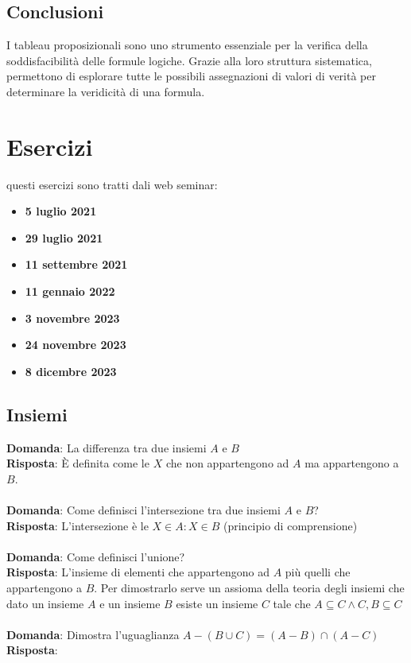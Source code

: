 \documentclass{article}
\begin{document}
\subsection{Conclusioni}

I tableau proposizionali sono uno strumento essenziale per la verifica della soddisfacibilità delle formule logiche. Grazie alla loro struttura sistematica, permettono di esplorare tutte le possibili assegnazioni di valori di verità per determinare la veridicità di una formula.

\newpage
\section{Esercizi}
questi esercizi sono tratti dali web seminar:
\begin{itemize}
    \item \textbf{5 luglio 2021}
    \item \textbf{29 luglio 2021}
    \item \textbf{11 settembre 2021}
    \item \textbf{11 gennaio 2022}
    \item \textbf{3 novembre 2023}
    \item \textbf{24 novembre 2023}
    \item \textbf{8 dicembre 2023}
\end{itemize}

\subsection{Insiemi}
\textbf{Domanda}: La differenza tra due insiemi $A$ e $B$  \\
\textbf{Risposta}: È definita come le $X$ che non appartengono ad $A$ ma appartengono a $B$. \\ \\
\textbf{Domanda}: Come definisci l'intersezione tra due insiemi $A$ e $B$? \\
\textbf{Risposta}: L'intersezione è le $X \in A: X \in B$ (principio di comprensione) \\ \\
\textbf{Domanda}: Come definisci l'unione? \\
\textbf{Risposta}: L'insieme di elementi che appartengono ad $A$ più quelli che appartengono a $B$. Per dimostrarlo serve un assioma della teoria degli insiemi che dato un insieme $A$ e un insieme $B$ esiste un insieme $C$ tale che $A \subseteq C \land C,B \subseteq C$ \\ \\
\textbf{Domanda}: Dimostra l'uguaglianza $A - (B \cup C) = (A - B) \cap (A - C)$ \\
\textbf{Risposta}: \\ \\
\end{document}
